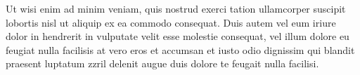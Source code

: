 \documentclass[output=paper]{langscibook}
\begin{document}
Ut wisi enim ad minim veniam, quis nostrud exerci tation ullamcorper suscipit lobortis nisl ut aliquip ex ea commodo consequat. Duis autem vel eum iriure dolor in hendrerit in vulputate velit esse molestie consequat, vel illum dolore eu feugiat nulla facilisis at vero eros et accumsan et iusto odio dignissim qui blandit praesent luptatum zzril delenit augue duis dolore te feugait nulla facilisi. 

 


\printbibliography[heading=subbibliography,notkeyword=this]
\end{document}
